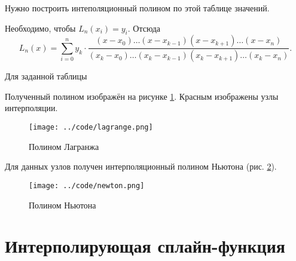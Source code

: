Нужно построить интеполяционный полином по этой таблице значений.

Необходимо, чтобы $L_n \left( x_i \right) = y_i$.
Отсюда
$$L_n \left( x \right) =
  \sum \limits_{i = 0}^n
    y_k \cdot
    \frac{ \left( x - x_0 \right) \dotsc \left( x - x_{k - 1} \right) \left( x - x_{k + 1} \right) \dotsc \left( x - x_n \right) }{ \left( x_k - x_0 \right) \dotsc \left( x_k - x_{k - 1} \right) \left( x_k - x_{k + 1} \right) \dotsc \left( x_k - x_n \right) }.$$

Для заданной таблицы
\lstset{inputencoding=utf8, extendedchars=\true}


Полученный полином изображён на рисунке \ref{fig:lagrange}.
Красным изображены узлы интерполяции.

\begin{figure}[h!]
  \centering
  \texttt{[image: ../code/lagrange.png]}
  \caption{Полином Лагранжа}
  \label{fig:lagrange}
\end{figure}

Для данных узлов получен интерполяционный полином Ньютона (рис. \ref{fig:newton}).

\begin{figure}[h!]
  \centering
  \texttt{[image: ../code/newton.png]}
  \caption{Полином Ньютона}
  \label{fig:newton}
\end{figure}

\chapter{Интерполирующая сплайн-функция}


